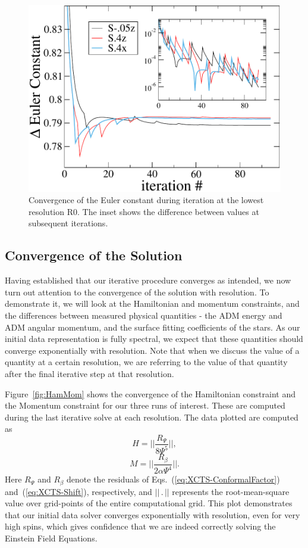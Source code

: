 {\begin{figure}
\includegraphics[width=0.95\columnwidth]{chap2/EulerConstConvergence}
\caption[Iterative convergence of the Euler constant.]{\label{fig:EulerConstConvergence}
Convergence of the Euler
  constant during iteration at the lowest resolution R0. The inset shows the difference
  between values at subsequent iterations.}
\end{figure}

\subsection{Convergence of the Solution}

Having established that our iterative procedure converges as intended,
we now turn out attention to the convergence of the solution with
resolution. 
To demonstrate it, we will look at the Hamiltonian and
momentum constraints, and the differences between measured physical
quantities - the ADM energy and ADM angular momentum, and the surface
fitting coefficients of the stars. As our initial data representation
is fully spectral, we expect that these quantities should converge
exponentially with resolution. Note that when we discuss the value of
a quantity at a certain resolution, we are referring to the value of
that quantity after the final iterative step at that
resolution.  

Figure~\ref{fig:HamMom} shows the convergence of the Hamiltonian
constraint and the Momentum constraint for our three runs of
interest.  These are computed during the last iterative solve at each
resolution.  The data plotted are computed as
\begin{equation}
H = ||\frac{R_\Psi}{8\Psi^5}||,
\end{equation}
\begin{equation}
M = ||\frac{R_{\beta}}{2\alpha\Psi^4}||.
\end{equation}
Here $R_\Psi$ and $R_\beta$ denote the residuals of Eqs.~(\ref{eq:XCTS-ConformalFactor}) and~(\ref{eq:XCTS-Shift}), respectively, and $||\,.\,||$ represents the root-mean-square value over grid-points of
the
 entire computational grid. 
This plot demonstrates that our initial
data solver converges  exponentially with resolution, even for
very high spins, which gives confidence that we are indeed correctly
solving the Einstein Field Equations.

}
